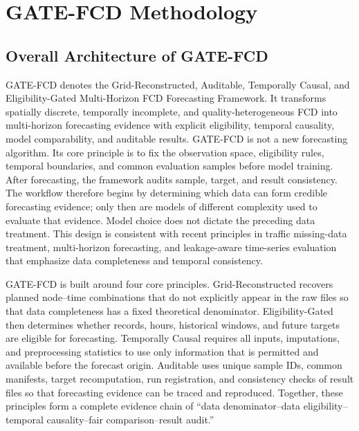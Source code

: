 \documentclass[pdflatex,sn-mathphys-num,iicol]{sn-jnl}
\begin{document}

\section{GATE-FCD Methodology}
\label{sec:methodology}



\subsection{Overall Architecture of GATE-FCD}
\label{subsec:overall-architecture}

GATE-FCD denotes the Grid-Reconstructed, Auditable, Temporally Causal, and Eligibility-Gated Multi-Horizon FCD Forecasting Framework. It transforms spatially discrete, temporally incomplete, and quality-heterogeneous FCD into multi-horizon forecasting evidence with explicit eligibility, temporal causality, model comparability, and auditable results. GATE-FCD is not a new forecasting algorithm. Its core principle is to fix the observation space, eligibility rules, temporal boundaries, and common evaluation samples before model training. After forecasting, the framework audits sample, target, and result consistency. The workflow therefore begins by determining which data can form credible forecasting evidence; only then are models of different complexity used to evaluate that evidence. Model choice does not dictate the preceding data treatment. This design is consistent with recent principles in traffic missing-data treatment, multi-horizon forecasting, and leakage-aware time-series evaluation that emphasize data completeness and temporal consistency.

GATE-FCD is built around four core principles. Grid-Reconstructed recovers planned node--time combinations that do not explicitly appear in the raw files so that data completeness has a fixed theoretical denominator. Eligibility-Gated then determines whether records, hours, historical windows, and future targets are eligible for forecasting. Temporally Causal requires all inputs, imputations, and preprocessing statistics to use only information that is permitted and available before the forecast origin. Auditable uses unique sample IDs, common manifests, target recomputation, run registration, and consistency checks of result files so that forecasting evidence can be traced and reproduced. Together, these principles form a complete evidence chain of ``data denominator--data eligibility--temporal causality--fair comparison--result audit.''
\end{document}

